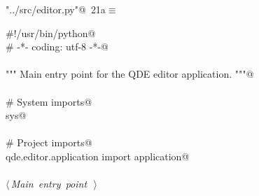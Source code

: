 \documentclass[
    a4paper,      %
    10pt,         %
    openright,    %
    notitlepage,  %
    parskip=half, %
]{scrreprt}       %
\theoremstyle{definition}                    %
\begin{document}
\begin{flushleft} \small
\begin{minipage}{\linewidth}\label{scrap15}\raggedright\small
{} \verb@"../src/editor.py"@\nobreak\ {\footnotesize {21a}}$\equiv$
\vspace{-1ex}
\begin{list}{}{} \item
\mbox{}\lstinline@#!/usr/bin/python@\\
\mbox{}\lstinline@# -*- coding: utf-8 -*-@\\
\mbox{}\lstinline@@\\
\mbox{}\lstinline@""" Main entry point for the QDE editor application. """@\\
\mbox{}\lstinline@@\\
\mbox{}\lstinline@# System imports@\\
\mbox{}\lstinline@import sys@\\
\mbox{}\lstinline@@\\
\mbox{}\lstinline@# Project imports@\\
\mbox{}\lstinline@from qde.editor.application import application@\\
\mbox{}\lstinline@@\\
\mbox{}\lstinline@@\hbox{$\langle\,${\itshape Main entry point}\nobreak\ {\footnotesize {}}$\,\rangle$}\lstinline@@\\
\mbox{}\lstinline@@{\NWsep}
\end{list}
\vspace{-1.5ex}
\footnotesize
\begin{list}{}{\setlength{\itemsep}{-\parsep}\setlength{\itemindent}{-\leftmargin}}

\item{}
\end{list}
\end{minipage}\vspace{4ex}
\end{flushleft}
\end{document}
